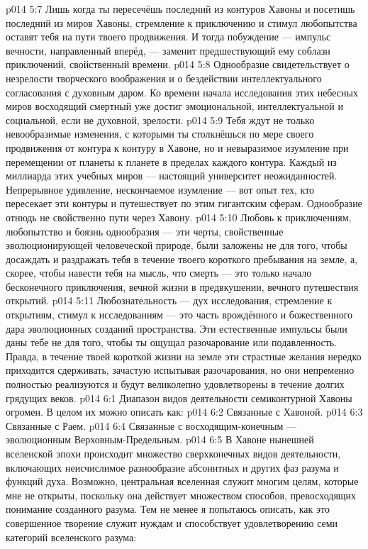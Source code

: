 \vs p014 5:7 Лишь когда ты пересечёшь последний из контуров Хавоны и посетишь последний из миров Хавоны, стремление к приключению и стимул любопытства оставят тебя на пути твоего продвижения. И тогда побуждение --- импульс вечности, направленный вперёд, --- заменит предшествующий ему соблазн приключений, свойственный времени.
\vs p014 5:8 Однообразие свидетельствует о незрелости творческого воображения и о бездействии интеллектуального согласования с духовным даром. Ко времени начала исследования этих небесных миров восходящий смертный уже достиг эмоциональной, интеллектуальной и социальной, если не духовной, зрелости.
\vs p014 5:9 Тебя ждут не только невообразимые изменения, с которыми ты столкнёшься по мере своего продвижения от контура к контуру в Хавоне, но и невыразимое изумление при перемещении от планеты к планете в пределах каждого контура. Каждый из миллиарда этих учебных миров --- настоящий университет неожиданностей. Непрерывное удивление, нескончаемое изумление --- вот опыт тех, кто пересекает эти контуры и путешествует по этим гигантским сферам. Однообразие отнюдь не свойственно пути через Хавону.
\vs p014 5:10 Любовь к приключениям, любопытство и боязнь однообразия --- эти черты, свойственные эволюционирующей человеческой природе, были заложены не для того, чтобы досаждать и раздражать тебя в течение твоего короткого пребывания на земле, а, скорее, чтобы навести тебя на мысль, что смерть --- это только начало бесконечного приключения, вечной жизни в предвкушении, вечного путешествия открытий.
\vs p014 5:11 Любознательность --- дух исследования, стремление к открытиям, стимул к исследованиям --- это часть врождённого и божественного дара эволюционных созданий пространства. Эти естественные импульсы были даны тебе не для того, чтобы ты ощущал разочарование или подавленность. Правда, в течение твоей короткой жизни на земле эти страстные желания нередко приходится сдерживать, зачастую испытывая разочарования, но они непременно полностью реализуются и будут великолепно удовлетворены в течение долгих грядущих веков.
\vs p014 6:1 Диапазон видов деятельности семиконтурной Хавоны огромен. В целом их можно описать как:
\vs p014 6:2 Связанные с Хавоной.
\vs p014 6:3 Связанные с Раем.
\vs p014 6:4 Связанные с восходящим\hyp{}конечным --- эволюционным Верховным\hyp{}Предельным.
\vs p014 6:5 \pc В Хавоне нынешней вселенской эпохи происходит множество сверхконечных видов деятельности, включающих неисчислимое разнообразие абсонитных и других фаз разума и функций духа. Возможно, центральная вселенная служит многим целям, которые мне не открыты, поскольку она действует множеством способов, превосходящих понимание созданного разума. Тем не менее я попытаюсь описать, как это совершенное творение служит нуждам и способствует удовлетворению семи категорий вселенского разума:

